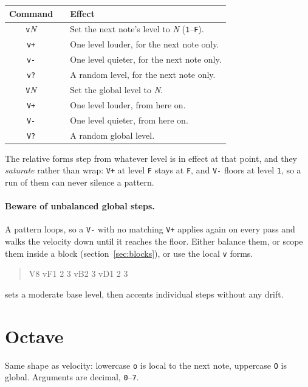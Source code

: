 \documentclass[11pt,a4paper]{article}
\newcommand{\pat}[1]{\texttt{#1}}
\newcommand{\meta}[1]{\textit{#1}}
\newenvironment{patternblock}
  {\begin{quote}\ttfamily\noindent}
  {\end{quote}}
\begin{document}
\begin{center}
\begin{tabular}{@{}clp{85mm}@{}}
\toprule
\textbf{Command} & & \textbf{Effect}\\
\midrule
\pat{v}\meta{N} & & Set the next note's level to \meta{N} (\pat{1}--\pat{F}).\\
\pat{v+}        & & One level louder, for the next note only.\\
\pat{v-}        & & One level quieter, for the next note only.\\
\pat{v?}        & & A random level, for the next note only.\\
\midrule
\pat{V}\meta{N} & & Set the global level to \meta{N}.\\
\pat{V+}        & & One level louder, from here on.\\
\pat{V-}        & & One level quieter, from here on.\\
\pat{V?}        & & A random global level.\\
\bottomrule
\end{tabular}
\end{center}

The relative forms step from whatever level is in effect at that point, and
they \emph{saturate} rather than wrap: \pat{V+} at level \pat{F} stays at
\pat{F}, and \pat{V-} floors at level \pat{1}, so a run of them can never
silence a pattern.

\paragraph{Beware of unbalanced global steps.} A pattern loops, so a
\pat{V-} with no matching \pat{V+} applies again on every pass and walks the
velocity down until it reaches the floor. Either balance them, or scope them
inside a block (section~\ref{sec:blocks}), or use the local \pat{v} forms.

\begin{patternblock}
V8 vF1 2 3 vB2 3 vD1 2 3
\end{patternblock}
\noindent
sets a moderate base level, then accents individual steps without any drift.

\section{Octave}

Same shape as velocity: lowercase \pat{o} is local to the next note, uppercase
\pat{O} is global. Arguments are decimal, \pat{0}--\pat{7}.
\end{document}
